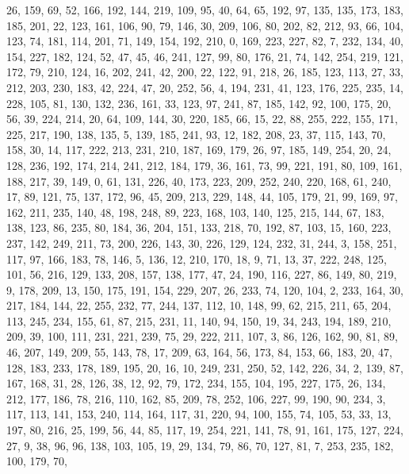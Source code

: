 \begin{DoxyCode}
       26, 159, 69, 52, 166, 192, 144, 219, 109, 95, 40, 64, 65, 192, 97, 135, 135, 173, 183, 185, 201, 22, 123, 161,
       106, 90, 79, 146, 30, 209, 106, 80, 202, 82, 212, 93, 66, 104, 123, 74, 181, 114, 201, 71, 149, 154, 192,
       210, 0, 169, 223, 227, 82, 7, 232, 134, 40, 154, 227, 182, 124, 52, 47, 45, 46, 241, 127, 99, 80, 176, 21,
       74, 142, 254, 219, 121, 172, 79, 210, 124, 16, 202, 241, 42, 200, 22, 122, 91, 218, 26, 185, 123, 113, 27, 33,
       212, 203, 230, 183, 42, 224, 47, 20, 252, 56, 4, 194, 231, 41, 123, 176, 225, 235, 14, 228, 105, 81, 130,
       132, 236, 161, 33, 123, 97, 241, 87, 185, 142, 92, 100, 175, 20, 56, 39, 224, 214, 20, 64, 109, 144, 30, 220,
       185, 66, 15, 22, 88, 255, 222, 155, 171, 225, 217, 190, 138, 135, 5, 139, 185, 241, 93, 12, 182, 208, 23,
       37, 115, 143, 70, 158, 30, 14, 117, 222, 213, 231, 210, 187, 169, 179, 26, 97, 185, 149, 254, 20, 24, 128,
       236, 192, 174, 214, 241, 212, 184, 179, 36, 161, 73, 99, 221, 191, 80, 109, 161, 188, 217, 39, 149, 0, 61,
       131, 226, 40, 173, 223, 209, 252, 240, 220, 168, 61, 240, 17, 89, 121, 75, 137, 172, 96, 45, 209, 213, 229,
       148, 44, 105, 179, 21, 99, 169, 97, 162, 211, 235, 140, 48, 198, 248, 89, 223, 168, 103, 140, 125, 215, 144,
       67, 183, 138, 123, 86, 235, 80, 184, 36, 204, 151, 133, 218, 70, 192, 87, 103, 15, 160, 223, 237, 142, 249,
       211, 73, 200, 226, 143, 30, 226, 129, 124, 232, 31, 244, 3, 158, 251, 117, 97, 166, 183, 78, 146, 5, 136, 12,
       210, 170, 18, 9, 71, 13, 37, 222, 248, 125, 101, 56, 216, 129, 133, 208, 157, 138, 177, 47, 24, 190, 116,
       227, 86, 149, 80, 219, 9, 178, 209, 13, 150, 175, 191, 154, 229, 207, 26, 233, 74, 120, 104, 2, 233, 164, 30,
       217, 184, 144, 22, 255, 232, 77, 244, 137, 112, 10, 148, 99, 62, 215, 211, 65, 204, 113, 245, 234, 155, 61,
       87, 215, 231, 11, 140, 94, 150, 19, 34, 243, 194, 189, 210, 209, 39, 100, 111, 231, 221, 239, 75, 29, 222,
       211, 107, 3, 86, 126, 162, 90, 81, 89, 46, 207, 149, 209, 55, 143, 78, 17, 209, 63, 164, 56, 173, 84, 153,
       66, 183, 20, 47, 128, 183, 233, 178, 189, 195, 20, 16, 10, 249, 231, 250, 52, 142, 226, 34, 2, 139, 87, 167,
       168, 31, 28, 126, 38, 12, 92, 79, 172, 234, 155, 104, 195, 227, 175, 26, 134, 212, 177, 186, 78, 216, 110,
       162, 85, 209, 78, 252, 106, 227, 99, 190, 90, 234, 3, 117, 113, 141, 153, 240, 114, 164, 117, 31, 220, 94,
       100, 155, 74, 105, 53, 33, 13, 197, 80, 216, 25, 199, 56, 44, 85, 117, 19, 254, 221, 141, 78, 91, 161, 175,
       127, 224, 27, 9, 38, 96, 96, 138, 103, 105, 19, 29, 134, 79, 86, 70, 127, 81, 7, 253, 235, 182, 100, 179, 70,

\end{DoxyCode}
